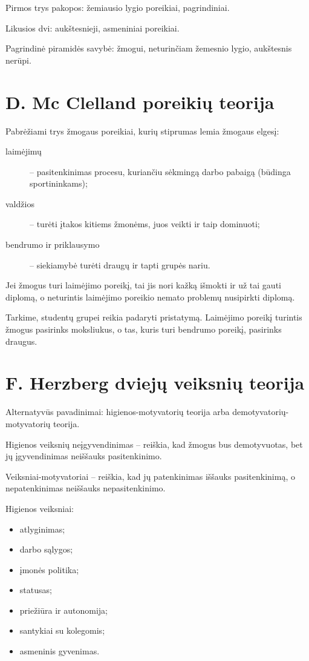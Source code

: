 Pirmos trys pakopos: žemiausio lygio poreikiai, pagrindiniai.

Likusios dvi: aukštesnieji, asmeniniai poreikiai.

Pagrindinė piramidės savybė: žmogui, neturinčiam žemesnio lygio, aukštesnis
nerūpi.

\section{D. Mc Clelland poreikių teorija}

Pabrėžiami trys žmogaus poreikiai, kurių stiprumas lemia žmogaus elgesį:
\begin{description}
  \item[laimėjimų] – pasitenkinimas procesu, kuriančiu sėkmingą darbo
    pabaigą (būdinga sportininkams);
  \item[valdžios] – turėti įtakos kitiems žmonėms, juos veikti ir
    taip dominuoti;
  \item[bendrumo ir priklausymo] – siekiamybė turėti draugų ir tapti
    grupės nariu.
\end{description}

\begin{exmp}
  Jei žmogus turi laimėjimo poreikį, tai jis nori kažką išmokti ir už
  tai gauti diplomą, o neturintis laimėjimo poreikio nemato problemų
  nusipirkti diplomą.
\end{exmp}

\begin{exmp}
  Tarkime, studentų grupei reikia padaryti pristatymą. Laimėjimo poreikį
  turintis žmogus pasirinks moksliukus, o tas, kuris turi bendrumo
  poreikį, pasirinks draugus.
\end{exmp}

\section{F. Herzberg dviejų veiksnių teorija}

Alternatyvūs pavadinimai: higienos-motyvatorių teorija arba
demotyvatorių-motyvatorių teorija.

Higienos veiksnių neįgyvendinimas – reiškia, kad žmogus bus demotyvuotas, 
bet jų įgyvendinimas neiššauks pasitenkinimo.

Veiksniai-motyvatoriai – reiškia, kad jų patenkinimas iššauks pasitenkinimą,
o nepatenkinimas neiššauks nepasitenkinimo.

Higienos veiksniai:
\begin{itemize}
  \item atlyginimas;
  \item darbo sąlygos;
  \item įmonės politika;
  \item statusas;
  \item priežiūra ir autonomija;
  \item santykiai su kolegomis;
  \item asmeninis gyvenimas.
\end{itemize}


